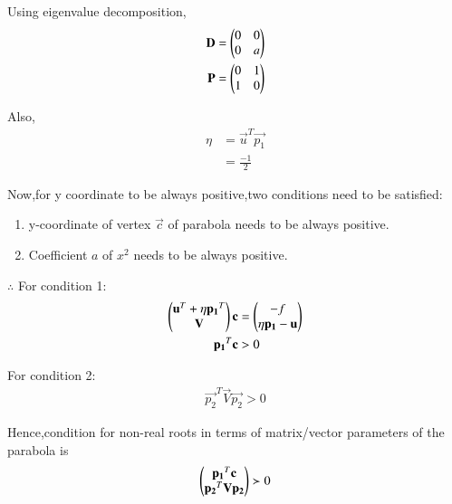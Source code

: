 \documentclass[journal,12pt,twocolumn]{IEEEtran}
\begin{document}
Using eigenvalue decomposition,
\begin{align}
    \mathbf{D} &= \begin{pmatrix}0 & 0 \\ 0 & a\end{pmatrix} \\
    \mathbf{P} &= \begin{pmatrix}0 & 1 \\ 1 & 0\end{pmatrix}
\end{align}

Also,
\begin{align}
    \eta &= \vec{u}^T\vec{p_1}
    \\
    &= \frac{-1}{2}
\end{align}

Now,for y coordinate to be always positive,two conditions need to be satisfied:
\begin{enumerate}
 \item y-coordinate of vertex $\vec{c}$ of parabola needs to be always positive.
 \item Coefficient $a$ of $x^2$ needs to be always positive.
\end{enumerate}

$\therefore$ For condition 1:
\begin{align}
    \begin{pmatrix}\mathbf{u}^T + \eta\mathbf{p_1}^T \\ \mathbf{V}\end{pmatrix}\mathbf{c} &= \begin{pmatrix}-f \\ \eta\mathbf{p_1}-\mathbf{u}\end{pmatrix} \\
    \mathbf{p_1}^T\mathbf{c} &> 0
\end{align}

For condition 2:
\begin{align}
    \vec{p_2}^T\vec{V}\vec{p_2} > 0
\end{align}

Hence,condition for non-real roots in terms of matrix/vector parameters of the parabola is 
\begin{align}
    \begin{pmatrix}\mathbf{p_1}^T\mathbf{c} \\ \mathbf{p_2}^T\mathbf{V}\mathbf{p_2} \end{pmatrix} \succ 0
\end{align}
\end{document}
